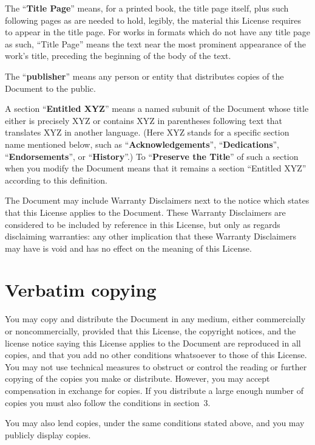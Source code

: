 The ``\textbf{Title Page}'' means, for a printed book, the title page itself,
plus such following pages as are needed to hold, legibly, the material
this License requires to appear in the title page.  For works in
formats which do not have any title page as such, ``Title Page'' means
the text near the most prominent appearance of the work's title,
preceding the beginning of the body of the text.

The ``\textbf{publisher}'' means any person or entity that distributes
copies of the Document to the public.

A section ``\textbf{Entitled XYZ}'' means a named subunit of the Document whose
title either is precisely XYZ or contains XYZ in parentheses following
text that translates XYZ in another language.  (Here XYZ stands for a
specific section name mentioned below, such as ``\textbf{Acknowledgements}'',
``\textbf{Dedications}'', ``\textbf{Endorsements}'', or ``\textbf{History}''.)
To ``\textbf{Preserve the Title}''
of such a section when you modify the Document means that it remains a
section ``Entitled XYZ'' according to this definition.

The Document may include Warranty Disclaimers next to the notice which
states that this License applies to the Document.  These Warranty
Disclaimers are considered to be included by reference in this
License, but only as regards disclaiming warranties: any other
implication that these Warranty Disclaimers may have is void and has
no effect on the meaning of this License.


\section{Verbatim copying}

You may copy and distribute the Document in any medium, either
commercially or noncommercially, provided that this License, the
copyright notices, and the license notice saying this License applies
to the Document are reproduced in all copies, and that you add no other
conditions whatsoever to those of this License.  You may not use
technical measures to obstruct or control the reading or further
copying of the copies you make or distribute.  However, you may accept
compensation in exchange for copies.  If you distribute a large enough
number of copies you must also follow the conditions in section~3.

You may also lend copies, under the same conditions stated above, and
you may publicly display copies.


